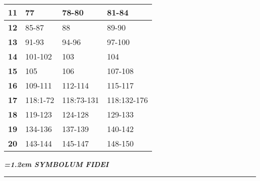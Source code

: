 \documentclass[twoside,10pt]{book}
\begin{document}
{{\begin{table}[ht]
\begin{tabular}{|cccc|}
    \multicolumn{1}{|c|}{\textbf{11}} & \multicolumn{1}{l|}{77} & \multicolumn{1}{l|}{78-80} & \multicolumn{1}{l|}{81-84} \\ \hline
    \multicolumn{1}{|c|}{\textbf{12}} & \multicolumn{1}{l|}{85-87} & \multicolumn{1}{l|}{88} & \multicolumn{1}{l|}{89-90} \\ \hline
    \multicolumn{1}{|c|}{\textbf{13}} & \multicolumn{1}{l|}{91-93} & \multicolumn{1}{l|}{94-96} & \multicolumn{1}{l|}{97-100} \\ \hline
    \multicolumn{1}{|c|}{\textbf{14}} & \multicolumn{1}{l|}{101-102} & \multicolumn{1}{l|}{103} & \multicolumn{1}{l|}{104} \\ \hline
    \multicolumn{1}{|c|}{\textbf{15}} & \multicolumn{1}{l|}{105} & \multicolumn{1}{l|}{106} & \multicolumn{1}{l|}{107-108} \\ \hline
    \multicolumn{1}{|c|}{\textbf{16}} & \multicolumn{1}{l|}{109-111} & \multicolumn{1}{l|}{112-114} & \multicolumn{1}{l|}{115-117} \\ \hline
    \multicolumn{1}{|c|}{\textbf{17}} & \multicolumn{1}{l|}{118:1-72} & \multicolumn{1}{l|}{118:73-131} & \multicolumn{1}{l|}{118:132-176} \\ \hline
    \multicolumn{1}{|c|}{\textbf{18}} & \multicolumn{1}{l|}{119-123} & \multicolumn{1}{l|}{124-128} & \multicolumn{1}{l|}{129-133} \\ \hline
    \multicolumn{1}{|c|}{\textbf{19}} & \multicolumn{1}{l|}{134-136} & \multicolumn{1}{l|}{137-139} & \multicolumn{1}{l|}{140-142} \\ \hline
    \multicolumn{1}{|c|}{\textbf{20}} & \multicolumn{1}{l|}{143-144} & \multicolumn{1}{l|}{145-147} & \multicolumn{1}{l|}{148-150} \\ \hline
    \end{tabular}
    \end{table}
  }
}

\newpage

\vspace*{0.60em}


{
  \medskip
  \begin{center}
  {\bfseries\itshape\large{}\font=1.2em \uppercase{symbolum fidei}}

  \bigskip

  \rule{25em}{0.4pt}
  
  \end{center}
  \medskip
}
\end{document}
